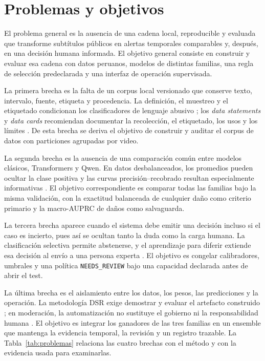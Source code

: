 \section{Problemas y objetivos}

El problema general es la ausencia de una cadena local, reproducible y evaluada que transforme subtítulos públicos en alertas temporales comparables y, después, en una decisión humana informada. El objetivo general consiste en construir y evaluar esa cadena con datos peruanos, modelos de distintas familias, una regla de selección predeclarada y una interfaz de operación supervisada.

La primera brecha es la falta de un corpus local versionado que conserve texto, intervalo, fuente, etiqueta y procedencia. La definición, el muestreo y el etiquetado condicionan los clasificadores de lenguaje abusivo \cite{vidgen2020directions}; los \emph{data statements} y \emph{data cards} recomiendan documentar la recolección, el etiquetado, los usos y los límites \cite{bender2018datastatements,pushkarna2022datacards}. De esta brecha se deriva el objetivo de construir y auditar el corpus de datos con particiones agrupadas por video.

La segunda brecha es la ausencia de una comparación común entre modelos clásicos, Transformers y Qwen. En datos desbalanceados, los promedios pueden ocultar la clase positiva y las curvas precisión--recobrado resultan especialmente informativas \cite{sokolova2009metrics,saito2015pr}. El objetivo correspondiente es comparar todas las familias bajo la misma validación, con la exactitud balanceada de cualquier daño como criterio primario y la macro-AUPRC de daños como salvaguarda.

La tercera brecha aparece cuando el sistema debe emitir una decisión incluso si el caso es incierto, pues así se ocultan tanto la duda como la carga humana. La clasificación selectiva permite abstenerse, y el aprendizaje para diferir extiende esa decisión al envío a una persona experta \cite{chow1970reject,geifman2017selective,mozannar2020defer}. El objetivo es congelar calibradores, umbrales y una política \texttt{NEEDS\_REVIEW} bajo una capacidad declarada antes de abrir el test.

La última brecha es el aislamiento entre los datos, los pesos, las predicciones y la operación. La metodología DSR exige demostrar y evaluar el artefacto construido \cite{hevner2004dsr,peffers2007dsrm}; en moderación, la automatización no sustituye el gobierno ni la responsabilidad humana \cite{gorwa2020moderation}. El objetivo es integrar los ganadores de las tres familias en un ensemble que mantenga la evidencia temporal, la revisión y un registro trazable. La Tabla~\ref{tab:problemas} relaciona las cuatro brechas con el método y con la evidencia usada para examinarlas.

